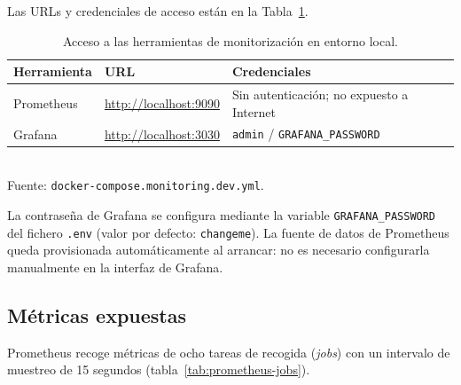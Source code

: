 Las URLs y credenciales de acceso están en la Tabla~\ref{tab:monitoring-urls}.

\begin{table}[h]
\centering
\caption{Acceso a las herramientas de monitorización en entorno local.}
\label{tab:monitoring-urls}
\begin{tabular}{lll}
\hline
\textbf{Herramienta} & \textbf{URL} & \textbf{Credenciales} \\
\hline
Prometheus & \url{http://localhost:9090} & Sin autenticación; no expuesto a Internet \\
Grafana & \url{http://localhost:3030} & \texttt{admin} / \texttt{GRAFANA\_PASSWORD} \\
\hline
\end{tabular}
\\[4pt]
{\footnotesize Fuente: \texttt{docker-compose.\allowbreak{}monitoring.\allowbreak{}dev.yml}.}
\end{table}

La contraseña de Grafana se configura mediante la variable \texttt{GRAFANA\_PASSWORD} del fichero \texttt{.env} (valor por defecto: \texttt{changeme}). La fuente de datos de Prometheus queda provisionada automáticamente al arrancar: no es necesario configurarla manualmente en la interfaz de Grafana.

\subsection{Métricas expuestas}

Prometheus recoge métricas de ocho tareas de recogida (\emph{jobs}) con un intervalo de muestreo de 15 segundos (tabla~\ref{tab:prometheus-jobs}).

